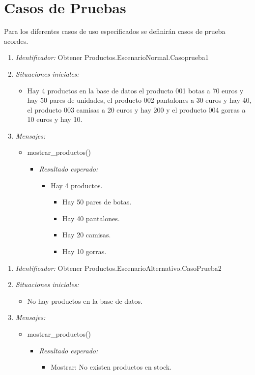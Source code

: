 \section{Casos de Pruebas}
Para los diferentes casos de uso especificados se definirán casos de prueba acordes.

\begin{enumerate}
\item {\it Identificador:} Obtener Productos.EscenarioNormal.Casoprueba1
\item {\it Situaciones iniciales:}
  \begin{itemize}
  \item Hay 4 productos en la base de datos el producto 001 botas a 70 euros y hay 50 pares de unidades, el producto 002 pantalones a 30 euros y hay 40, el producto 003 camisas a 20 euros y hay 200 y el producto 004 gorras a 10 euros y hay 10.
  \end{itemize}
\item {\it Mensajes:}
  \begin{itemize}
  \item mostrar\_productos()
    \begin{itemize}
    \item {\it Resultado esperado:}
      \begin{itemize}
      \item Hay 4 productos.
        \begin{itemize}
        \item Hay 50 pares de botas.
        \item Hay 40 pantalones.
        \item Hay 20 camisas.
        \item Hay 10 gorras.
        \end{itemize}
      \end{itemize}
    \end{itemize}
  \end{itemize}
\end{enumerate}

\begin{enumerate} 
\item {\it Identificador:} Obtener Productos.EscenarioAlternativo.CasoPrueba2
\item {\it Situaciones iniciales:}
  \begin{itemize}
  \item No hay productos en la base de datos.
  \end{itemize}
\item {\it Mensajes:}
  \begin{itemize}
  \item mostrar\_productos()
    \begin{itemize}
    \item {\it Resultado esperado:}
      \begin{itemize}
      \item Mostrar: No existen productos en stock.
      \end{itemize}
    \end{itemize}
  \end{itemize}
\end{enumerate}


